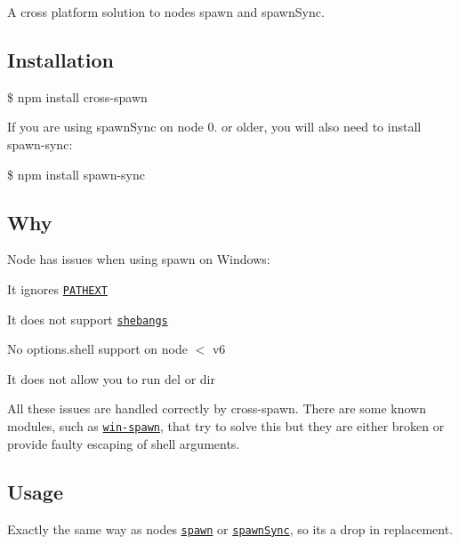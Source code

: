 \href{https://npmjs.org/package/cross-spawn}{\tt } \href{https://npmjs.org/package/cross-spawn}{\tt } \href{https://travis-ci.org/IndigoUnited/node-cross-spawn}{\tt } \href{https://ci.appveyor.com/project/satazor/node-cross-spawn}{\tt } \href{https://david-dm.org/IndigoUnited/node-cross-spawn}{\tt } \href{https://david-dm.org/IndigoUnited/node-cross-spawn#info=devDependencies}{\tt }

A cross platform solution to node\textquotesingle{}s spawn and spawn\+Sync.

\subsection*{Installation}

{\ttfamily \$ npm install cross-\/spawn}

If you are using {\ttfamily spawn\+Sync} on node 0. or older, you will also need to install {\ttfamily spawn-\/sync}\+:

{\ttfamily \$ npm install spawn-\/sync}

\subsection*{Why}

Node has issues when using spawn on Windows\+:


\begin{DoxyItemize}
\item It ignores \href{https://github.com/joyent/node/issues/2318}{\tt P\+A\+T\+H\+E\+XT}
\item It does not support \href{http://pt.wikipedia.org/wiki/Shebang}{\tt shebangs}
\item No {\ttfamily options.\+shell} support on node $<$ v6
\item It does not allow you to run {\ttfamily del} or {\ttfamily dir}
\end{DoxyItemize}

All these issues are handled correctly by {\ttfamily cross-\/spawn}. There are some known modules, such as \href{https://github.com/ForbesLindesay/win-spawn}{\tt win-\/spawn}, that try to solve this but they are either broken or provide faulty escaping of shell arguments.

\subsection*{Usage}

Exactly the same way as node\textquotesingle{}s \href{https://nodejs.org/api/child_process.html#child_process_child_process_spawn_command_args_options}{\tt {\ttfamily spawn}} or \href{https://nodejs.org/api/child_process.html#child_process_child_process_spawnsync_command_args_options}{\tt {\ttfamily spawn\+Sync}}, so it\textquotesingle{}s a drop in replacement.


